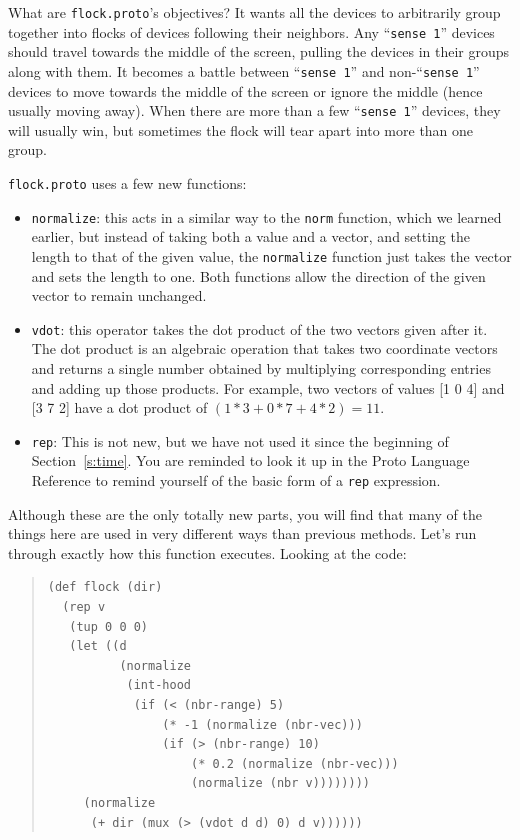 \documentclass{article}
\newcommand\var[1]{{\tt #1}}
\newcommand\qvar[1]{``{\tt #1}''}
\begin{document}
What are \var{flock.proto}'s objectives?  It wants all the devices to
arbitrarily group together into flocks of devices following their
neighbors.  Any \qvar{sense 1} devices should travel towards the
middle of the screen, pulling the devices in their groups along with
them.  It becomes a battle between \qvar{sense 1} and non-\qvar{sense
  1} devices to move towards the middle of the screen or ignore the
middle (hence usually moving away).  When there are more than a few
\qvar{sense 1} devices, they will usually win, but sometimes the flock
will tear apart into more than one group.

\var{flock.proto} uses a few new functions:
\begin{itemize}
\item \var{normalize}: this acts in a similar way to the \var{norm}
  function, which we learned earlier, but instead of taking both a
  value and a vector, and setting the length to that of the given
  value, the \var{normalize} function just takes the vector and sets
  the length to one.  Both functions allow the direction of the
  given vector to remain unchanged.
\item \var{vdot}: this operator takes the dot product of the two
  vectors given after it.  The dot product is an algebraic operation
  that takes two coordinate vectors and returns a single number
  obtained by multiplying corresponding entries and adding up those
  products.  For example, two vectors of values [1 0 4] and [3 7 2]
  have a dot product of $(1 * 3 + 0 * 7 + 4 * 2) = 11$.
\item \var{rep}: This is not new, but we have not used it since the
  beginning of Section~\ref{s:time}.  You are reminded to look it up
  in the Proto Language Reference to remind yourself of the
  basic form of a \var{rep} expression.
\end{itemize}

Although these are the only totally new parts, you will find that many
of the things here are used in very different ways than previous
methods.  Let's run through exactly how this function executes.  Looking
at the code:
	
\begin{quote}
\begin{verbatim}
(def flock (dir)
  (rep v
   (tup 0 0 0)
   (let ((d
          (normalize
           (int-hood
            (if (< (nbr-range) 5)
                (* -1 (normalize (nbr-vec)))
                (if (> (nbr-range) 10)
                    (* 0.2 (normalize (nbr-vec)))
                    (normalize (nbr v))))))))
     (normalize
      (+ dir (mux (> (vdot d d) 0) d v))))))
\end{verbatim}
\end{quote}
\end{document}
